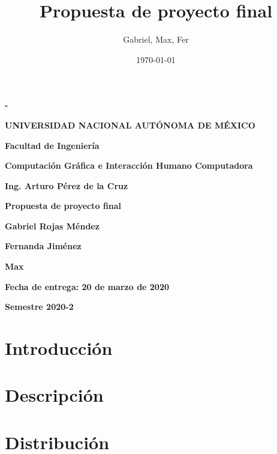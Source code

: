 \documentclass[12pt]{article} %
\title{Propuesta de proyecto final}
\author{Gabriel, Max, Fer}
\date{\today}
\begin{document}
	\begin{titlepage}
		\thispagestyle{fancy}
		\centering
		{\bfseries - \par}
		\vspace{1cm}
		{\bfseries\LARGE UNIVERSIDAD NACIONAL AUTÓNOMA DE MÉXICO \par}
		\vspace{1cm}
		{\bfseries\LARGE Facultad de Ingeniería \par}
		\vspace{1cm}
		{\bfseries\LARGE Computación Gráfica e Interacción Humano Computadora \par}
		\vspace{1cm}
		{\bfseries\LARGE Ing. Arturo Pérez de la Cruz \par}
		\vspace{1cm}
		{\bfseries\LARGE Propuesta de proyecto final \par}
		\vspace{1cm}
		{\bfseries\LARGE Gabriel Rojas Méndez \par}
		{\bfseries\LARGE Fernanda Jiménez \par}
		{\bfseries\LARGE Max \par}
		\vspace{1cm}
		{\bfseries\LARGE Fecha de entrega: 20 de marzo de 2020 \par}
		\vspace{1cm}
		{\bfseries\LARGE Semestre 2020-2 \par}
	\end{titlepage}

	\newpage
	\section{Introducción}
	\newpage
	\section{Descripción}
	\newpage
	\section{Distribución}
	
\end{document}
